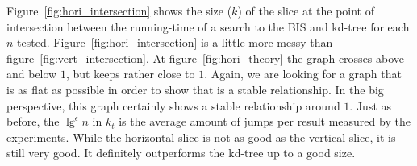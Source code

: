 Figure~\ref{fig:hori_intersection} shows the size ($k$) of the slice at the point of intersection between the running-time of a search to the BIS and kd-tree for each $n$ tested. Figure~\ref{fig:hori_intersection} is a little more messy than figure~\ref{fig:vert_intersection}. At figure~\ref{fig:hori_theory} the graph crosses above and below $1$, but keeps rather close to $1$. Again, we are looking for a graph that is as flat as possible in order to show that is a stable relationship. In the big perspective, this graph certainly shows a stable relationship around $1$. Just as before, the $\lg^\epsilon n$ in $k_t$ is the average amount of jumps per result measured by the experiments. While the horizontal slice is not as good as the vertical slice, it is still very good. It definitely outperforms the kd-tree up to a good size.

